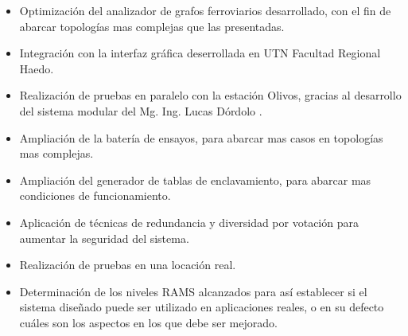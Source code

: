 	\begin{itemize}
		\item Optimización del analizador de grafos ferroviarios desarrollado, con el fin de abarcar topologías mas complejas que las presentadas.
		\item Integración con la interfaz gráfica deserrollada en UTN Facultad Regional Haedo.
		\item Realización de pruebas en paralelo con la estación Olivos, gracias al desarrollo del sistema modular del Mg. Ing. Lucas Dórdolo \cite{Lucas}.
		\item Ampliación de la batería de ensayos, para abarcar mas casos en topologías mas complejas.
		\item Ampliación del generador de tablas de enclavamiento, para abarcar mas condiciones de funcionamiento.
		\item Aplicación de técnicas de redundancia y diversidad por votación para aumentar la seguridad del sistema.
		\item Realización de pruebas en una locación real.
		\item Determinación de los niveles RAMS alcanzados para así establecer si el sistema diseñado puede ser utilizado en aplicaciones reales, o en su defecto cuáles son los aspectos en los que debe ser mejorado.
	\end{itemize}
